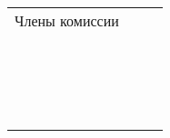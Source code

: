 \begin{center}
	\begin{tabular}[c]{c m{4cm} l}

		     Члены комиссии      &            &                     \\
								 & 			  &      \\		     
								 & \hrulefill & \dcExpertOneRegaliaShort\ \dcExpertOneFIO      \\
								 & 			  &      \\
							     & \hrulefill & \dcExpertTwoRegaliaShort\ \dcExpertTwoFIO                   \\
								 & 			  &      \\							 
								 & \hrulefill & \dcExpertThreeRegaliaShort\ \dcExpertThreeFIO \\
	\end{tabular}
\end{center}
\clearpage